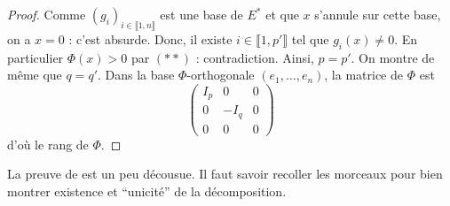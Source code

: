 \begin{proof}
    Comme $(g_i)_{i \in \llbracket 1, n \rrbracket}$ est une base de $E^*$ et que $x$ s'annule sur cette base, on a $x = 0$ : c'est absurde. Donc, il existe $i \in \llbracket 1, p' \rrbracket$ tel que $g_i(x) \neq 0$. En particulier $\Phi(x) > 0$ par $(**)$ : contradiction. Ainsi, $p = p'$. On montre de même que $q = q'$.
    \newpar
    Dans la base $\Phi$-orthogonale $(e_1, \dots, e_n)$, la matrice de $\Phi$ est
    \[ \begin{pmatrix}
      I_p & 0 & 0 \\
      0 & -I_q & 0 \\
      0 & 0 & 0
    \end{pmatrix} \]
    d'où le rang de $\Phi$.
  \end{proof}

  La preuve de \cite{[GOU21]} est un peu décousue. Il faut savoir recoller les morceaux pour bien montrer existence et ``unicité'' de la décomposition.

